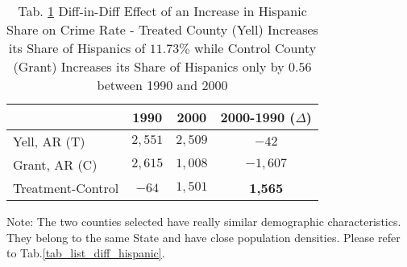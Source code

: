 \documentclass[a4paper,12pt]{article}
\begin{document}
\begin{table}[h]
\setlength\belowcaptionskip{10pt}
\begin{center}
\caption {Tab. \ref{tab_diff_in_diff} Diff-in-Diff Effect of an Increase in Hispanic Share on Crime Rate - Treated County (Yell) Increases its Share of Hispanics of $11.73\%$ while Control County (Grant) Increases its Share of Hispanics only by $0.56$ between 1990 and 2000}
\renewcommand{\arraystretch}{1.5}
\begin{tabular}{ | l | c | c | c |}
\hline
 & 1990 & 2000 & 2000-1990 ($\Delta$) \\ \hline
Yell, AR (T) & $2,551$ & $2,509$ & $-42$  \\ \hline
Grant, AR (C) & $2,615$ & $1,008$ & $-1,607$ \\ \hline
Treatment-Control & $-64$ & $1,501$ & \textbf{1,565} \\ \hline
\end{tabular}
\begin{tablenotes}
\begin{footnotesize}
Note: The two counties selected have really similar demographic characteristics. They belong to the same State and have close population densities. Please refer to Tab.\ref{tab_list_diff_hispanic}.
\end{footnotesize}
\end{tablenotes}
\label{tab_diff_in_diff}
\end{center}
\end{table}
\end{document}
